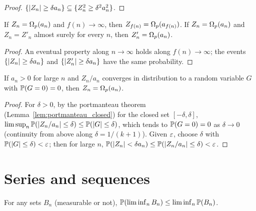 \begin{proof}
  \leanok
  $\{\lvert Z_n \rvert \ge \delta a_n\} \subseteq \{Z_n^2 \ge \delta^2 a_n^2\}$.
\end{proof}

\begin{lemma}
  \label{lem:isBigOmegaInProb_comp}
  \leanok
  If $Z_n = \Omega_p(a_n)$ and $f(n) \to \infty$, then $Z_{f(n)} = \Omega_p(a_{f(n)})$. If $Z_n = \Omega_p(a_n)$
  and $Z_n = Z'_n$ almost surely for every $n$, then $Z'_n = \Omega_p(a_n)$.
\end{lemma}

\begin{proof}
  \leanok
  An eventual property along $n \to \infty$ holds along $f(n) \to \infty$; the events
  $\{\lvert Z_n \rvert \ge \delta a_n\}$ and $\{\lvert Z'_n \rvert \ge \delta a_n\}$ have the same probability.
\end{proof}

\begin{lemma}
  \label{lem:isBigOmegaInProb_of_tendstoInDistribution}
  \leanok
  If $a_n > 0$ for large $n$ and $Z_n / a_n$ converges in distribution to a random variable $G$ with
  $\mathbb{P}(G = 0) = 0$, then $Z_n = \Omega_p(a_n)$.
\end{lemma}

\begin{proof}
  \leanok
  For $\delta > 0$, by the portmanteau theorem (Lemma~\ref{lem:portmanteau_closed}) for the closed
  set $[-\delta, \delta]$,
  $\limsup_n \mathbb{P}(\lvert Z_n/a_n \rvert \le \delta) \le \mathbb{P}(\lvert G \rvert \le \delta)$, which tends to
  $\mathbb{P}(G = 0) = 0$ as $\delta \to 0$ (continuity from above along $\delta = 1/(k+1)$). Given
  $\varepsilon$, choose $\delta$ with $\mathbb{P}(\lvert G \rvert \le \delta) < \varepsilon$; then for large $n$,
  $\mathbb{P}(\lvert Z_n \rvert < \delta a_n) \le \mathbb{P}(\lvert Z_n/a_n \rvert \le \delta) < \varepsilon$.
\end{proof}

\section{Series and sequences}

\begin{lemma}
  \label{lem:measure_liminf_le}
  \leanok
  For any sets $B_n$ (measurable or not), $\mathbb{P}(\liminf_n B_n) \le \liminf_n \mathbb{P}(B_n)$.
\end{lemma}

